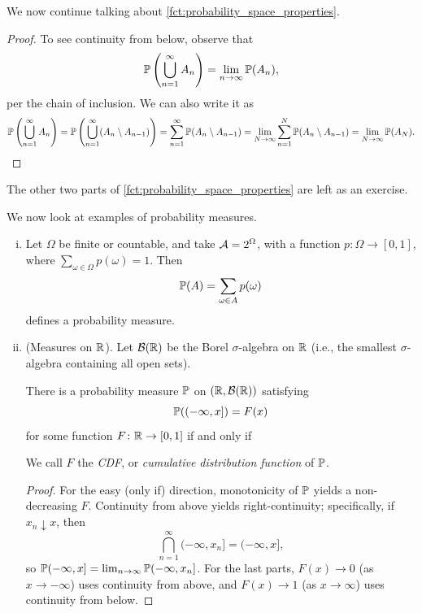 We now continue talking about \ref{fct:probability_space_properties}.
\begin{proof}
    To see continuity from below, observe that
    \[ \mathbb P\left(\bigcup_{n=1}^\infty A_n\right) = \lim_{n \to \infty} \mathbb P(A_n), \]
    per the chain of inclusion. We can also write it as
    \[ \mathbb P\left(\bigcup_{n=1}^\infty A_n\right) = \mathbb P\left(\bigcup_{n=1}^\infty (A_n \setminus A_{n-1})\right) = \sum_{n=1}^\infty \mathbb P(A_n \setminus A_{n-1}) = \lim_{N \to \infty} \sum_{n=1}^N \mathbb P(A_n \setminus A_{n-1}) = \lim_{N \to \infty} \mathbb P(A_N). \qedhere \]
\end{proof}
The other two parts of \ref{fct:probability_space_properties} are left as an exercise.

We now look at examples of probability measures.
\begin{enumerate}[(i)]
    \item Let $\Omega$ be finite or countable, and take $\mathcal A = 2^\Omega$, with a function $p \colon \Omega \to [0 ,1]$, where $\sum_{\omega \in \Omega} p(\omega) = 1$. Then
    \[ \mathbb P(A) = \sum_{\omega \in A} p(\omega) \]
    defines a probability measure.
    \item (Measures on $\mathbb R$). Let $\mathcal B(\mathbb R)$ be the Borel $\sigma$-algebra on $\mathbb R$ (i.e., the smallest $\sigma$-algebra containing all open sets).
    \begin{theorem}
        There is a probability measure $\mathbb P$ on $(\mathbb R, \mathcal B(\mathbb R))$ satisfying
        \[ \mathbb P((-\infty, x]) = F(x) \]
        for some function $F \colon \mathbb R \to [0, 1]$ if and only if 
        We call $F$ the \textit{CDF}, or \textit{cumulative distribution function} of $\mathbb P$.
    \end{theorem}
    \begin{proof}
        For the easy (only if) direction, monotonicity of $\mathbb P$ yields a non-decreasing $F$. Continuity from above yields right-continuity; specifically, if $x_n \downarrow x$, then
        \[ \bigcap_{n=1}^\infty (-\infty, x_n] = (-\infty, x], \]
        so $\mathbb P(-\infty, x] = \lim_{n \to \infty} \mathbb P(-\infty, x_n]$. For the last parts, $F(x) \to 0$ (as $x \to -\infty$) uses continuity from above, and $F(x) \to 1$ (as $x \to \infty$) uses continuity from below.


\end{proof}
\end{enumerate}
